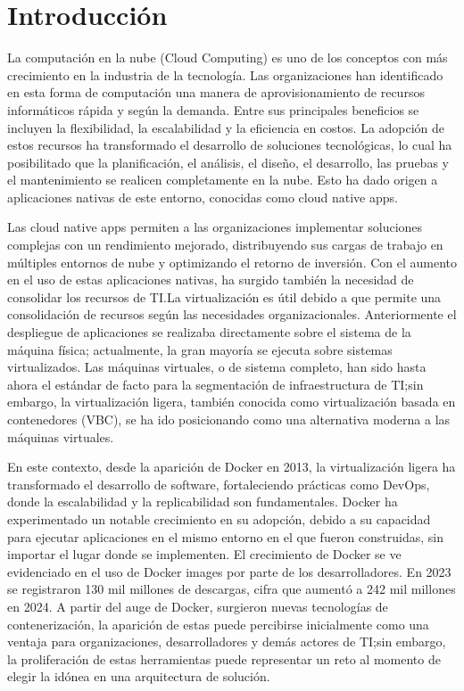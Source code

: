 \chapter*{Introducción}
La computación en la nube (Cloud Computing) es uno de los conceptos con más crecimiento en la industria de la tecnología\citep{Jayaweera2024}. Las organizaciones han identificado en esta forma de computación una manera de aprovisionamiento de recursos informáticos rápida y según la demanda. Entre sus principales beneficios se incluyen la flexibilidad, la escalabilidad y la eficiencia en costos\cite{Ahmadi2024}. La adopción de estos recursos ha transformado el desarrollo de soluciones tecnológicas, lo cual ha posibilitado que la planificación, el análisis, el diseño, el desarrollo, las pruebas y el mantenimiento se realicen completamente en la nube. Esto ha dado origen a aplicaciones nativas de este entorno, conocidas como cloud native apps.

Las cloud native apps permiten a las organizaciones implementar soluciones complejas con un rendimiento mejorado, distribuyendo sus cargas de trabajo en múltiples entornos de nube y optimizando el retorno de inversión\citep{Alonso2023}. Con el aumento en el uso de estas aplicaciones nativas, ha surgido también la necesidad de consolidar los recursos de TI.\@ La virtualización es útil debido a que permite una consolidación de recursos según las necesidades organizacionales. Anteriormente el despliegue de aplicaciones se realizaba directamente sobre el sistema de la máquina física; actualmente, la gran mayoría se ejecuta sobre sistemas virtualizados\citep{Jain2016}. Las máquinas virtuales, o de sistema completo, han sido hasta ahora el estándar de facto para la segmentación de infraestructura de TI;\@ sin embargo, la virtualización ligera, también conocida como virtualización basada en contenedores (VBC), se ha ido posicionando como una alternativa moderna a las máquinas virtuales.

En este contexto, desde la aparición de Docker en 2013, la virtualización ligera ha transformado el desarrollo de software, fortaleciendo prácticas como DevOps, donde la escalabilidad y la replicabilidad son fundamentales\citep{Docker2021}. Docker ha experimentado un notable crecimiento en su adopción, debido a su capacidad para ejecutar aplicaciones en el mismo entorno en el que fueron construidas, sin importar el lugar donde se implementen. El crecimiento de Docker se ve evidenciado en el uso de Docker images por parte de los desarrolladores. En 2023 se registraron 130 mil millones de descargas, cifra que aumentó a 242 mil millones en 2024\citep{Docker2024}. A partir del auge de Docker, surgieron nuevas tecnologías de contenerización, la aparición de estas puede percibirse inicialmente como una ventaja para organizaciones, desarrolladores y demás actores de TI;\@ sin embargo, la proliferación de estas herramientas puede representar un reto al momento de elegir la idónea en una arquitectura de solución.

